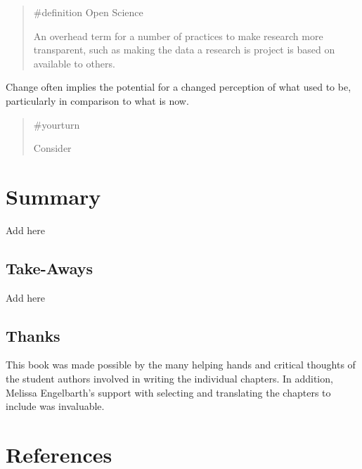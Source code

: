 \documentclass[
  letterpaper,
]{book}
\begin{document}
\begin{quote}
{\#definition} Open Science

An overhead term for a number of practices to make research more
transparent, such as making the data a research is project is based on
available to others.
\end{quote}

Change often implies the potential for a changed perception of what used
to be, particularly in comparison to what is now.

\begin{quote}
{\#yourturn}

Consider
\end{quote}


\chapter*{\texorpdfstring{{Summary}}{Summary}}\label{summary}


Add here

\section*{Take-Aways}\label{take-aways}


Add here

\section*{Thanks}\label{thanks}


This book was made possible by the many helping hands and critical
thoughts of the student authors involved in writing the individual
chapters. In addition, Melissa Engelbarth's support with selecting and
translating the chapters to include was invaluable.


\chapter*{References}\label{references}
\end{document}
